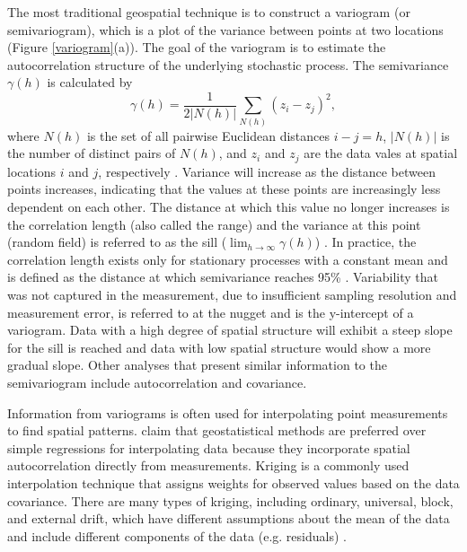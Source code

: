 \documentclass[12pt]{article}
\begin{document}
The most traditional geospatial technique is to construct a variogram (or semivariogram), which is a plot of the variance between points at two locations (Figure \ref{variogram}(a)). The goal of the variogram is to estimate the autocorrelation structure of the underlying stochastic process. The semivariance $\gamma \left(h\right)$ is calculated by
\begin{equation}
\gamma(h) = \frac{1}{2\left| N(h) \right|}\sum_{N(h)} \left(z_i-z_j \right)^2 ,
\end{equation}
where $N(h)$ is the set of all pairwise Euclidean distances $i-j=h$, $\left|N(h)\right|$ is the number of distinct pairs of $N(h)$, and $z_i$ and $z_j$ are the data vales at spatial locations $i$ and $j$, respectively \citep{Schirmer2011a}. Variance will increase as the distance between points increases, indicating that the values at these points are increasingly less dependent on each other. The distance at which this value no longer increases is the correlation length (also called the range) and the variance at this point (random field) is referred to as the sill ($\lim_{h\to\infty}\gamma(h)$) \citep{Srivastava2013}. In practice, the correlation length exists only for stationary processes with a constant mean and is defined as the distance at which semivariance reaches 95\% \citep{Deems2006a}. Variability that was not captured in the measurement, due to insufficient sampling resolution and measurement error, is referred to at the nugget and is the y-intercept of a variogram. Data with a high degree of spatial structure will exhibit a steep slope for the sill is reached and data with low spatial structure would show a more gradual slope. Other analyses that present similar information to the semivariogram include autocorrelation and covariance.

Information from variograms is often used for interpolating point measurements to find spatial patterns. \cite{Reuter2016} claim that geostatistical methods are preferred over simple regressions for interpolating data because they incorporate spatial autocorrelation directly from measurements. Kriging is a commonly used interpolation technique that assigns weights for observed values based on the data covariance. There are many types of kriging, including ordinary, universal, block, and external drift, which have different assumptions about the mean of the data and include different components of the data (e.g. residuals) \citep{Webster2001}. 
\end{document}
